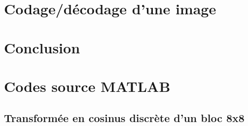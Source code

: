 \documentclass[a4paper, 12pt]{article}
\newcommand{\FSource}[1]{%

}
\begin{document}
\section{Codage/décodage d'une image}

\newpage

\section{Conclusion}



\clearpage

%
%
\appendix

\section{Codes source MATLAB}
\subsection{Transformée en cosinus discrète d'un bloc 8x8}\label{dct_code}

\FSource{../MyDCT.m}

\newpage
\end{document}
